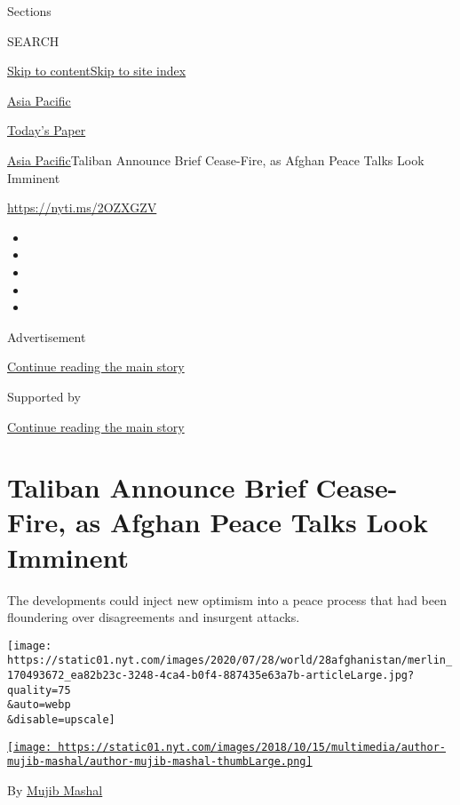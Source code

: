Sections

SEARCH

\protect\hyperlink{site-content}{Skip to
content}\protect\hyperlink{site-index}{Skip to site index}

\href{https://www.nytimes.com/section/world/asia}{Asia Pacific}

\href{https://myaccount.nytimes.com/auth/login?response_type=cookie\&client_id=vi}{}

\href{https://www.nytimes.com/section/todayspaper}{Today's Paper}

\href{/section/world/asia}{Asia Pacific}\textbar{}Taliban Announce Brief
Cease-Fire, as Afghan Peace Talks Look Imminent

\url{https://nyti.ms/2OZXGZV}

\begin{itemize}
\item
\item
\item
\item
\item
\end{itemize}

Advertisement

\protect\hyperlink{after-top}{Continue reading the main story}

Supported by

\protect\hyperlink{after-sponsor}{Continue reading the main story}

\hypertarget{taliban-announce-brief-cease-fire-as-afghan-peace-talks-look-imminent}{%
\section{Taliban Announce Brief Cease-Fire, as Afghan Peace Talks Look
Imminent}\label{taliban-announce-brief-cease-fire-as-afghan-peace-talks-look-imminent}}

The developments could inject new optimism into a peace process that had
been floundering over disagreements and insurgent attacks.

\texttt{[image: https://static01.nyt.com/images/2020/07/28/world/28afghanistan/merlin\_170493672\_ea82b23c-3248-4ca4-b0f4-887435e63a7b-articleLarge.jpg?quality=75\\\&auto=webp\\\&disable=upscale]}

\href{https://www.nytimes.com/by/mujib-mashal}{\texttt{[image: https://static01.nyt.com/images/2018/10/15/multimedia/author-mujib-mashal/author-mujib-mashal-thumbLarge.png]}}

By \href{https://www.nytimes.com/by/mujib-mashal}{Mujib Mashal}

